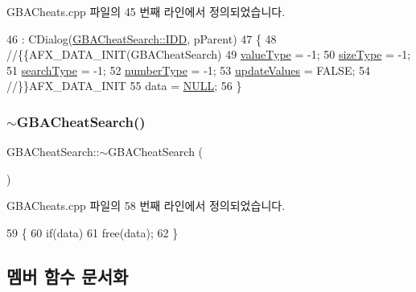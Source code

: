 G\+B\+A\+Cheats.\+cpp 파일의 45 번째 라인에서 정의되었습니다.


\begin{DoxyCode}
46   : CDialog(\mbox{\hyperlink{class_g_b_a_cheat_search_aad94fa4948a9a182e3d5a15c5d0bf02fa210cc376f2b661862a7031b55a0e5ceb}{GBACheatSearch::IDD}}, pParent)
47 \{
48   \textcolor{comment}{//\{\{AFX\_DATA\_INIT(GBACheatSearch)}
49   \mbox{\hyperlink{class_g_b_a_cheat_search_a633f5b523a814d3f1e4cb06b1799b798}{valueType}} = -1;
50   \mbox{\hyperlink{class_g_b_a_cheat_search_a9fc543b94f045d8c778cf921c06cc2c3}{sizeType}} = -1;
51   \mbox{\hyperlink{class_g_b_a_cheat_search_a708b5bbf00916b2ff173eb07273b1db5}{searchType}} = -1;
52   \mbox{\hyperlink{class_g_b_a_cheat_search_a5f4137be5a232d58a5cf4e03c72b008c}{numberType}} = -1;
53   \mbox{\hyperlink{class_g_b_a_cheat_search_a1b8eec1d7b81c1e297b71c4de071550f}{updateValues}} = FALSE;
54   \textcolor{comment}{//\}\}AFX\_DATA\_INIT}
55   data = \mbox{\hyperlink{getopt1_8c_a070d2ce7b6bb7e5c05602aa8c308d0c4}{NULL}};
56 \}
\end{DoxyCode}
\mbox{\label{class_g_b_a_cheat_search_a3c856e36f9d3fae6e11d53705132e177}} 
\subsubsection{\texorpdfstring{$\sim$\+G\+B\+A\+Cheat\+Search()}{~GBACheatSearch()}}
{\footnotesize\ttfamily G\+B\+A\+Cheat\+Search\+::$\sim$\+G\+B\+A\+Cheat\+Search (\begin{DoxyParamCaption}{ }\end{DoxyParamCaption})}



G\+B\+A\+Cheats.\+cpp 파일의 58 번째 라인에서 정의되었습니다.


\begin{DoxyCode}
59 \{
60   \textcolor{keywordflow}{if}(data)
61     free(data);
62 \}
\end{DoxyCode}


\subsection{멤버 함수 문서화}
\mbox{\label{class_g_b_a_cheat_search_afefabf8fcfe952b062d260152c595415}} 
